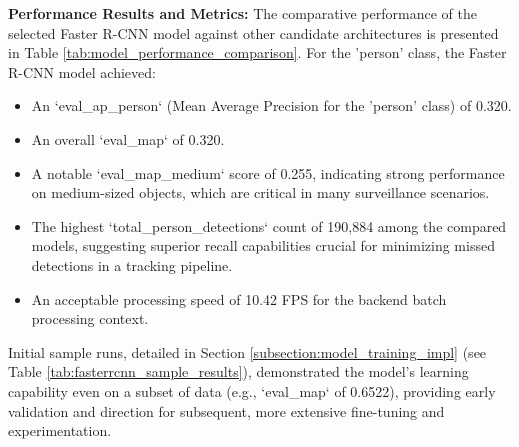 \textbf{Performance Results and Metrics:}
The comparative performance of the selected Faster R-CNN model against other candidate architectures is presented in Table \ref{tab:model_performance_comparison}. For the 'person' class, the Faster R-CNN model achieved:
\begin{itemize}
    \item An `eval_ap_person` (Mean Average Precision for the 'person' class) of 0.320.
    \item An overall `eval_map` of 0.320.
    \item A notable `eval_map_medium` score of 0.255, indicating strong performance on medium-sized objects, which are critical in many surveillance scenarios.
    \item The highest `total_person_detections` count of 190,884 among the compared models, suggesting superior recall capabilities crucial for minimizing missed detections in a tracking pipeline.
    \item An acceptable processing speed of 10.42 FPS for the backend batch processing context.
\end{itemize}
Initial sample runs, detailed in Section \ref{subsection:model_training_impl} (see Table \ref{tab:fasterrcnn_sample_results}), demonstrated the model's learning capability even on a subset of data (e.g., `eval_map` of 0.6522), providing early validation and direction for subsequent, more extensive fine-tuning and experimentation.

